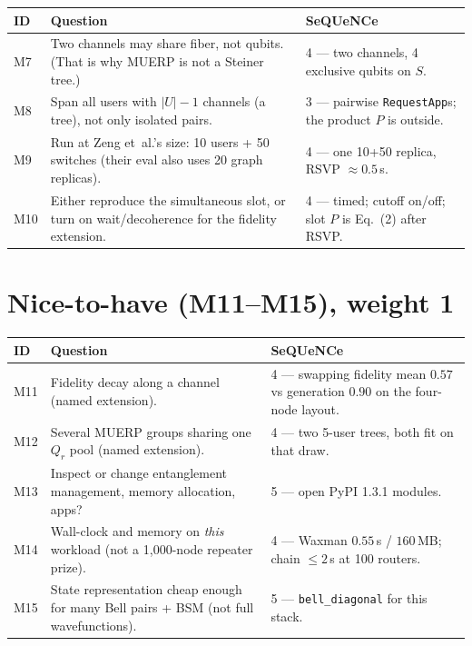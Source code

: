 \documentclass[11pt]{article}
\begin{document}
\begin{center}
\begin{tabularx}{\textwidth}{@{}l Y Y@{}}
\toprule
ID & Question & SeQUeNCe \\
\midrule
M7 & Two channels may share fiber, not qubits. (That is why MUERP is not a Steiner tree.) & 4 --- two channels, 4 exclusive qubits on $S$. \\
M8 & Span all users with $|U|-1$ channels (a tree), not only isolated pairs. & 3 --- pairwise \texttt{RequestApp}s; the product $P$ is outside. \\
M9 & Run at Zeng et~al.'s size: 10 users + 50 switches (their eval also uses 20 graph replicas). & 4 --- one 10+50 replica, RSVP $\approx 0.5$\,s. \\
M10 & Either reproduce the simultaneous slot, or turn on wait/decoherence for the fidelity extension. & 4 --- timed; cutoff on/off; slot $P$ is Eq.~(2) after RSVP. \\
\bottomrule
\end{tabularx}
\end{center}

\section{Nice-to-have (M11--M15), weight 1}

\begin{center}
\begin{tabularx}{\textwidth}{@{}l Y Y@{}}
\toprule
ID & Question & SeQUeNCe \\
\midrule
M11 & Fidelity decay along a channel (named extension). & 4 --- swapping fidelity mean $0.57$ vs generation $0.90$ on the four-node layout. \\
M12 & Several MUERP groups sharing one $Q_r$ pool (named extension). & 4 --- two 5-user trees, both fit on that draw. \\
M13 & Inspect or change entanglement management, memory allocation, apps? & 5 --- open PyPI 1.3.1 modules. \\
M14 & Wall-clock and memory on \emph{this} workload (not a 1{,}000-node repeater prize). & 4 --- Waxman $0.55$\,s / $160$\,MB; chain $\le 2$\,s at 100 routers. \\
M15 & State representation cheap enough for many Bell pairs + BSM (not full wavefunctions). & 5 --- \texttt{bell\_diagonal} for this stack. \\
\bottomrule
\end{tabularx}
\end{center}
\end{document}
